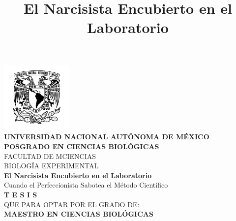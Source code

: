 \documentclass[
  10pt]{article}
\title{El Narcisista Encubierto en el Laboratorio}
\begin{document}

\pagestyle{plain} %

\begin{titlepage}
    \begin{center}
        \vspace*{-0.2cm} %
        
        \includegraphics[width=3.5cm]{ figuras/unam.png }\\[0.5cm]
        
        {\large \textbf{UNIVERSIDAD NACIONAL AUTÓNOMA DE MÉXICO}}\\[0.4cm]
        
        {\large \textbf{\MakeUppercase{Posgrado en Ciencias
Biológicas}}}\\[0.3cm]
        
        {\large \MakeUppercase{Facultad de mCiencias}}\\[0.2cm]
        {\large \MakeUppercase{Biología Experimental}}\\[0.3cm]
        
        {\Large \textbf{El Narcisista Encubierto en el
Laboratorio}}\\[0.2cm]
        {\small  Cuando el Perfeccionista Sabotea el Método
Científico }\\[0.2cm]
        
        {\LARGE \textbf{T E S I S}}\\[0.5cm]
        
        {\large QUE PARA OPTAR POR EL GRADO DE:}\\[0.15cm]
        {\Large \textbf{MAESTRO EN CIENCIAS BIOLÓGICAS}}\\[0.4cm]
        

\end{center}
\end{titlepage}
\end{document}

